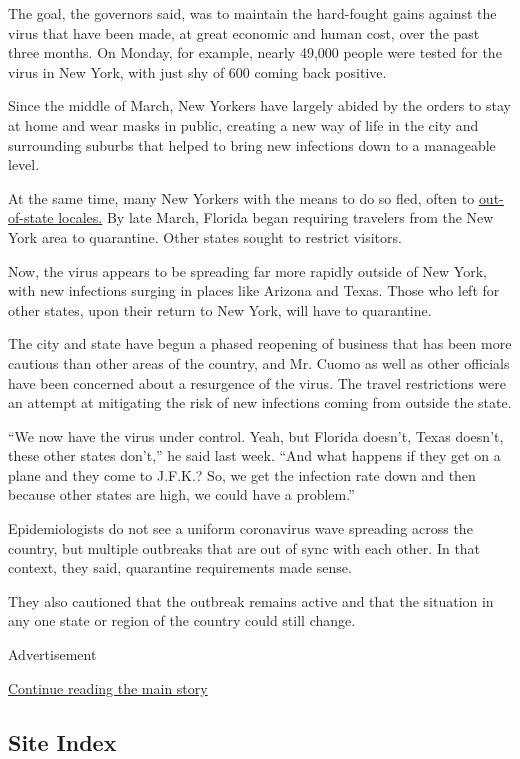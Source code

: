The goal, the governors said, was to maintain the hard-fought gains
against the virus that have been made, at great economic and human cost,
over the past three months. On Monday, for example, nearly 49,000 people
were tested for the virus in New York, with just shy of 600 coming back
positive.

Since the middle of March, New Yorkers have largely abided by the orders
to stay at home and wear masks in public, creating a new way of life in
the city and surrounding suburbs that helped to bring new infections
down to a manageable level.

At the same time, many New Yorkers with the means to do so fled, often
to
\href{https://www.nytimes.com/interactive/2020/05/16/nyregion/nyc-coronavirus-moving-leaving.html}{out-of-state
locales.} By late March, Florida began requiring travelers from the New
York area to quarantine. Other states sought to restrict visitors.

Now, the virus appears to be spreading far more rapidly outside of New
York, with new infections surging in places like Arizona and Texas.
Those who left for other states, upon their return to New York, will
have to quarantine.

The city and state have begun a phased reopening of business that has
been more cautious than other areas of the country, and Mr. Cuomo as
well as other officials have been concerned about a resurgence of the
virus. The travel restrictions were an attempt at mitigating the risk of
new infections coming from outside the state.

``We now have the virus under control. Yeah, but Florida doesn't, Texas
doesn't, these other states don't,'' he said last week. ``And what
happens if they get on a plane and they come to J.F.K.? So, we get the
infection rate down and then because other states are high, we could
have a problem.''

Epidemiologists do not see a uniform coronavirus wave spreading across
the country, but multiple outbreaks that are out of sync with each
other. In that context, they said, quarantine requirements made sense.

They also cautioned that the outbreak remains active and that the
situation in any one state or region of the country could still change.

Advertisement

\protect\hyperlink{after-bottom}{Continue reading the main story}

\hypertarget{site-index}{%
\subsection{Site Index}\label{site-index}}

